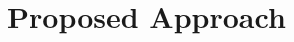 \documentclass{article}
\begin{document}

\section{Proposed Approach}
\label{sec:approach}

\end{document}
